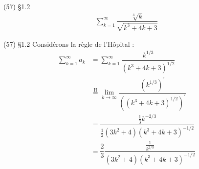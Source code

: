 \documentclass{report}
\begin{document}
\begin{multicols*}{3}
        \begin{Exercice}{(57) \S 1.2}{}
            \begin{align*}
                \sum_{k=1}^{\infty}\dfrac{\sqrt[3]{k}}
                {\sqrt{k^3 + 4k +3}}
            \end{align*} 
        \end{Exercice}


        \begin{Reponse}{(57) \S 1.2}{}
            Considérons la règle de l'Hôpital : 
            \begin{align*}
                 \sum_{k=1}^{\infty}a_k  
                 &=
                 \sum_{k=1}^{\infty}\dfrac{k^{1/3}} 
                 {(k^3 + 4k +3)^{1/2}} \\ 
                 &\overset{\mathrm{H}}{=}
                 \lim\limits_{k\to\infty }\dfrac{(k^{1/3})^{\prime}} 
                 {\left((k^3 + 4k +3)^{1/2}\right)^{\prime}}  
                 \\ 
                 &= \dfrac{\frac{1}{3}k^{-2/3}} 
                 {\frac{1}{2}(3k^2 + 4)(k^3 + 4k +3)^{-1/2}} \\
                 &=
                 \dfrac{2}{3} 
                 \dfrac{\frac{1}{k^{2/3}}}
                 {(3k^2 + 4)(k^3 + 4k +3)^{-1/2}}
            \end{align*}

        \end{Reponse}





        






 \end{multicols*}
\end{document}
